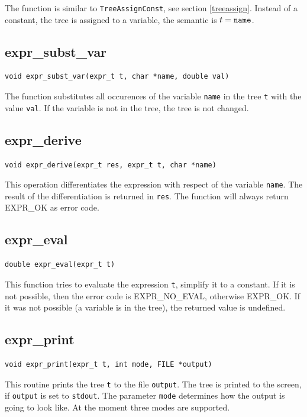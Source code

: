 The function is similar to {\tt TreeAssignConst}, see section 
\ref{treeassign}. Instead of a constant, the tree is assigned to a
variable, \ie the semantic is $t = \mbox{{\tt name}}$.

\subsection{expr\_subst\_var}
\begin{verbatim}
void expr_subst_var(expr_t t, char *name, double val)
\end{verbatim}

The function substitutes all occurences of the variable {\tt name} in 
the tree {\tt t} with the value {\tt val}. If the variable is not 
in the tree, the tree is not changed.

\subsection{expr\_derive}
\begin{verbatim}
void expr_derive(expr_t res, expr_t t, char *name)
\end{verbatim}

This operation differentiates the expression with respect of the 
variable {\tt name}. The result of the differentiation is returned 
in {\tt res}. The function will always return EXPR\_OK as error code.

\subsection{expr\_eval}
\begin{verbatim}
double expr_eval(expr_t t)
\end{verbatim}

This function tries to evaluate the expression {\tt t}, \ie simplify 
it to a constant. If it is not possible, then the error code is
EXPR\_NO\_EVAL, otherwise EXPR\_OK. If it was not possible
(a variable is in the tree), the returned value is undefined.

\subsection{expr\_print}
\begin{verbatim}
void expr_print(expr_t t, int mode, FILE *output)
\end{verbatim}

This routine prints the tree {\tt t} to the file {\tt output}. 
The tree is printed to the screen, if {\tt output} is set to 
{\tt stdout}. The parameter {\tt mode} determines
how the output is going to look like. At the moment three modes are
supported. 


